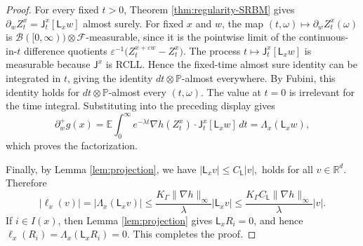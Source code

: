 \documentclass[aihp]{imsart}
\numberwithin{equation}{section}
\theoremstyle{plain}
\theoremstyle{definition}
\newcommand{\1}{\mathbf 1}
\begin{document}
\begin{proof}
For every fixed \(t>0\), Theorem \ref{thm:regularity-SRBM} gives $\partial_w Z_t^x = \mathsf J_t^x[\mathsf L_xw]$ almost surely. For fixed \(x\) and \(w\), the map $(t,\omega)\mapsto \partial_w Z_t^x(\omega)$ is \(\mathcal B([0,\infty))\otimes\mathcal F\)-measurable, since it is the
pointwise limit of the continuous-in-\(t\) difference quotients $\varepsilon^{-1}\bigl(Z_t^{x+\varepsilon w}-Z_t^x\bigr).$ The process \(t\mapsto \mathsf J_t^x[\mathsf L_xw]\) is measurable because \(\mathsf J^x\) is RCLL. Hence the fixed-time almost sure identity can be integrated in \(t\), giving
the identity \(dt\otimes\mathbb P\)-almost everywhere. By Fubini, this identity holds for \(dt\otimes\mathbb P\)-almost every
\((t,\omega)\). The value at \(t=0\) is irrelevant for the time integral.
Substituting into the preceding display gives
\begin{equation}
\partial_w^+ g(x)
=
\mathbb E\int_0^\infty e^{-\lambda t}
\nabla h(Z_t^x)\cdot \mathsf J_t^x[\mathsf L_xw]\,dt
=
\Lambda_x(\mathsf L_xw),
\end{equation}
which proves the factorization.

Finally, by Lemma \ref{lem:projection}, we have $|\mathsf L_xv|\le C_{\mathsf L}|v|,$ holds for all $v\in\mathbb R^d.$ Therefore
\[
|\ell_x(v)|
=
|\Lambda_x(\mathsf L_xv)|
\le
\frac{K_\Gamma\|\nabla h\|_\infty}{\lambda}|\mathsf L_xv|
\le
\frac{K_\Gamma C_{\mathsf L}\|\nabla h\|_\infty}{\lambda}|v|.
\]
If \(i\in I(x)\), then Lemma \ref{lem:projection} gives \(\mathsf L_xR_i=0\), and hence $\ell_x(R_i)=\Lambda_x(\mathsf L_xR_i)=0.$ This completes the proof.
\end{proof}
\end{document}
